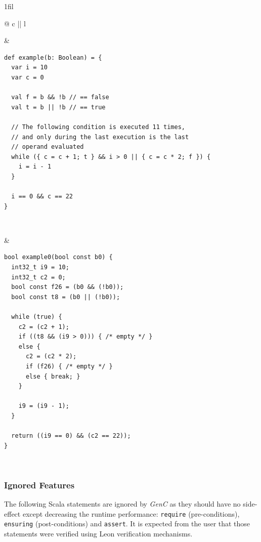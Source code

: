 \documentclass{article}
\makeatletter
\newcommand{\inlinecode}[1]{\lstinline[basicstyle=\ttfamily]|#1|}
\newcommand{\inlineScala}[1]{\lstinline[language=MyScala]|#1|}
\newcommand{\vheading}[1]{\rotatebox[origin=c]{90}{~\textbf{#1}~}}
\newcommand*{\centerfloat}{%
  \parindent \z@
  \leftskip \z@ \@plus 1fil \@minus \textwidth
  \rightskip\leftskip
  \parfillskip \z@skip}
\newcommand{\GenC}{\emph{GenC}\xspace}
\makeatother
\begin{document}
\begin{table}[h]
  \centerfloat
  \begin{tabular}{@{} c || l}
    \toprule

    \vheading{Scala} &
    \begin{lstlisting}[language=MyScala]
def example(b: Boolean) = {
  var i = 10
  var c = 0

  val f = b && !b // == false
  val t = b || !b // == true

  // The following condition is executed 11 times,
  // and only during the last execution is the last
  // operand evaluated
  while ({ c = c + 1; t } && i > 0 || { c = c * 2; f }) {
    i = i - 1
  }

  i == 0 && c == 22
}
    \end{lstlisting} \\

    \midrule

    \vheading{C99} &
    \begin{lstlisting}[language=C99]
bool example0(bool const b0) {
  int32_t i9 = 10;
  int32_t c2 = 0;
  bool const f26 = (b0 && (!b0));
  bool const t8 = (b0 || (!b0));

  while (true) {
    c2 = (c2 + 1);
    if ((t8 && (i9 > 0))) { /* empty */ }
    else {
      c2 = (c2 * 2);
      if (f26) { /* empty */ }
      else { break; }
    }

    i9 = (i9 - 1);
  }

  return ((i9 == 0) && (c2 == 22));
}
    \end{lstlisting} \\

    \bottomrule
  \end{tabular}
  \caption{Example of execution normalisation of \inlinecode{while}-statement in C99}
  \label{tab:example-exec-order-while}
\end{table}



\FloatBarrier
\subsubsection{Ignored Features}

The following Scala statements are ignored by \GenC as they should have no
side-effect except decreasing the runtime performance: \inlineScala{require}
(pre-conditions), \inlineScala{ensuring} (post-conditions) and
\inlineScala{assert}. It is expected from the user that those statements were
verified using Leon verification mechanisms.
\end{document}

